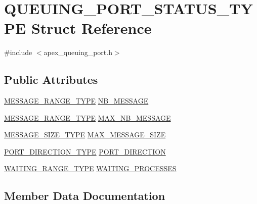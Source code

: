 \hypertarget{structQUEUING__PORT__STATUS__TYPE}{}\section{Q\+U\+E\+U\+I\+N\+G\+\_\+\+P\+O\+R\+T\+\_\+\+S\+T\+A\+T\+U\+S\+\_\+\+T\+Y\+PE Struct Reference}
\label{structQUEUING__PORT__STATUS__TYPE}


{\ttfamily \#include $<$apex\+\_\+queuing\+\_\+port.\+h$>$}

\subsection*{Public Attributes}
\begin{DoxyCompactItemize}
\item 
\hyperlink{apex__types_8h_aeffd61fe45ce21b94c1f0b5b84e614ea}{M\+E\+S\+S\+A\+G\+E\+\_\+\+R\+A\+N\+G\+E\+\_\+\+T\+Y\+PE} \hyperlink{structQUEUING__PORT__STATUS__TYPE_a205c62d4635ec296b618807a2c099530}{N\+B\+\_\+\+M\+E\+S\+S\+A\+GE}
\item 
\hyperlink{apex__types_8h_aeffd61fe45ce21b94c1f0b5b84e614ea}{M\+E\+S\+S\+A\+G\+E\+\_\+\+R\+A\+N\+G\+E\+\_\+\+T\+Y\+PE} \hyperlink{structQUEUING__PORT__STATUS__TYPE_a801e072e20f37f50eab52bed36647f34}{M\+A\+X\+\_\+\+N\+B\+\_\+\+M\+E\+S\+S\+A\+GE}
\item 
\hyperlink{apex__types_8h_ae09494a8d78c38c94f0cc5a80e69785a}{M\+E\+S\+S\+A\+G\+E\+\_\+\+S\+I\+Z\+E\+\_\+\+T\+Y\+PE} \hyperlink{structQUEUING__PORT__STATUS__TYPE_adac8033102332e5adb686befa554ed48}{M\+A\+X\+\_\+\+M\+E\+S\+S\+A\+G\+E\+\_\+\+S\+I\+ZE}
\item 
\hyperlink{apex__types_8h_ae82fcf2f7f6f7966d59d9569049531a4}{P\+O\+R\+T\+\_\+\+D\+I\+R\+E\+C\+T\+I\+O\+N\+\_\+\+T\+Y\+PE} \hyperlink{structQUEUING__PORT__STATUS__TYPE_af3d8b40327cd03b1397e441441408738}{P\+O\+R\+T\+\_\+\+D\+I\+R\+E\+C\+T\+I\+ON}
\item 
\hyperlink{apex__process_8h_a77a39a661169092676366eec0d65ab1c}{W\+A\+I\+T\+I\+N\+G\+\_\+\+R\+A\+N\+G\+E\+\_\+\+T\+Y\+PE} \hyperlink{structQUEUING__PORT__STATUS__TYPE_a4b68d92cd2d0481a18ba44cfeb6f9e44}{W\+A\+I\+T\+I\+N\+G\+\_\+\+P\+R\+O\+C\+E\+S\+S\+ES}
\end{DoxyCompactItemize}


\subsection{Member Data Documentation}
